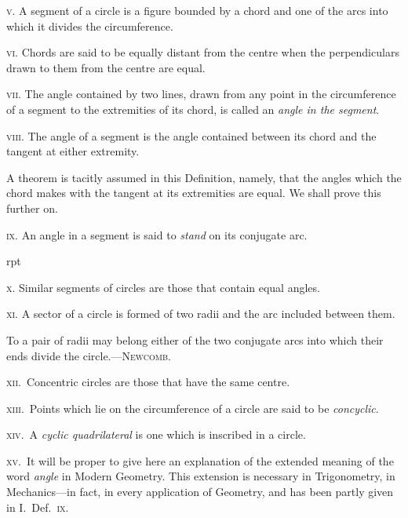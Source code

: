 \documentclass[oneside]{book}
\newcounter{wrapwidth}
\newcommand\imgflow[3]{
\setcounter{wrapwidth}{#1}

\begin{wrapfigure}[#2]{r}{\value{wrapwidth}pt}
\begin{center}
\vspace{-0.3in}

\end{center}
\end{wrapfigure}
}
\begin{document}
\textsc{v.} A segment of a circle is a figure bounded by a
chord and one of the arcs into which it divides the
circumference.

\textsc{vi.} Chords are said to be equally distant from the
centre when the perpendiculars drawn to them from
the centre are equal.

\textsc{vii.} The angle contained by two lines, drawn from
any point in the circumference of a segment to the
extremities of its chord, is called an \emph{angle in the segment}.

\textsc{viii.} The angle of a segment is the angle contained
between its chord and the tangent at either extremity.\par\smallskip

\begin{footnotesize}
A theorem is tacitly assumed in this Definition, namely, that
the angles which the chord makes with the tangent at its extremities
are equal. We shall prove this further on.
\par\end{footnotesize}\smallskip

\textsc{ix.} An angle in a segment is said to \emph{stand} on its
conjugate arc.


\imgflow{95}{6}{f102}

\textsc{x.} Similar segments of circles are
those that contain equal angles.

\textsc{xi.} A sector of a circle is formed
of two radii and the arc included
between them.\par\smallskip

\begin{footnotesize}
To a pair of radii may belong either of the two conjugate arcs
into which their ends divide the circle.---\textsc{Newcomb}.
\par\end{footnotesize}\smallskip



\textsc{xii}.\ Concentric circles are those that have the same
centre.

\textsc{xiii}.\ Points which lie on the circumference of a
circle are said to be \emph{concyclic}.

\textsc{xiv}.\ A \emph{cyclic quadrilateral} is one which is inscribed
in a circle.

\textsc{xv}.\ It will be proper to give here an explanation of
the extended meaning of the word \emph{angle} in Modern
Geometry. This extension is necessary in Trigonometry,
in Mechanics---in fact, in every application of
Geometry, and has been partly given in I.\ Def.\ \textsc{ix}.
\end{document}
